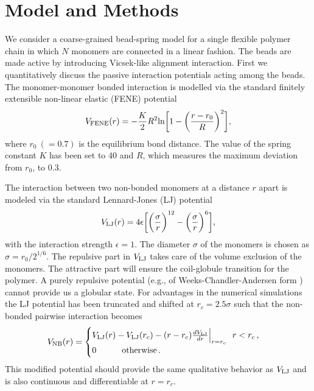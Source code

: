 \documentclass[aps,prx,reprint,showpacs,showkeys,noeprint,longbibliography]{revtex4-1} %
\begin{document}
\section{ Model and Methods}\label{model}
\par 
We consider a coarse-grained bead-spring model for a single flexible polymer chain in which  
 $N$  monomers are connected in a linear fashion. The beads are made active by introducing Vicsek-like 
alignment interaction.
First we quantitatively discuss the passive interaction potentials acting 
among the beads.
The monomer-monomer bonded interaction is modelled via the standard finitely extensible non-linear elastic (FENE) potential \cite{majumder3, majumder4, milchev, majumder1}
\begin{equation}
V_{\rm{FENE}}(r) = - \frac{K}{2}R^2 {\rm{ln}} \bigg[ 1- \bigg(\frac{r-r_0}{R}\bigg)^2\bigg],
\end{equation}
where $r_0~(=0.7)$ is the equilibrium bond distance. The value of the spring constant $K$ has been set to $40$ and $R$, which measures the maximum deviation from $r_0$, to $0.3$.
\par 
The interaction between two non-bonded monomers at a distance $r$ apart is modeled via the standard Lennard-Jones (LJ) potential \cite{majumder1, majumder3,das1}
\begin{equation}
 V_{\rm{LJ}}(r) = 4\epsilon \bigg[\bigg(\frac{\sigma}{r}\bigg)^{12}- \bigg(\frac{\sigma}{r}\bigg)^6\bigg],
\end{equation}
with the interaction strength $\epsilon =1$. The diameter $\sigma$ of the monomers is chosen as $\sigma= r_0/2^{1/6}$.
The repulsive part in $V_{\rm{LJ}}$ takes care of the volume exclusion of 
the monomers. The attractive part will ensure the coil-globule transition 
for the polymer. A purely repulsive potential (e.g., of Weeks-Chandler-Andersen form \cite{wca_71}) 
cannot provide us a globular state.
For advantages in the numerical simulations the LJ potential has been truncated and shifted at $r_c=2.5\sigma$ such that the non-bonded pairwise 
interaction becomes \cite{frenkel}
\begin{equation}
  V_{\rm{NB}}(r)=
\begin{cases}
  V_{\rm{LJ}}(r)-V_{\rm{LJ}}(r_c) -(r-r_c)\frac{dV_{\rm{LJ}}}{dr}\Big|_{r=r_c} ~~ r<r_c \,,\\
 0 ~~~~~~~~~ \text{otherwise}\,.
   \end{cases}
\end{equation}
This modified potential should provide the same qualitative behavior as $V_{\rm{LJ}}$ and is also continuous and differentiable at $r=r_c$.\\
\end{document}
